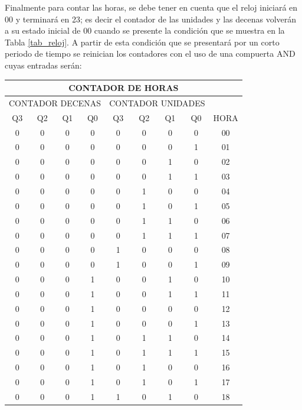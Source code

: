 \documentclass[journal]{IEEEtran}
\begin{document}
Finalmente para contar las horas, se debe tener en cuenta que el reloj iniciará en 00 y terminará en 23; es decir el contador de las unidades y las decenas volverán a su estado inicial de 00 cuando se presente la condición que se muestra en la Tabla \ref{tab_reloj}. A partir de esta condición que se presentará por un corto periodo de tiempo se reinician los contadores con el uso de una compuerta AND cuyas entradas serán:
\begin{table}[htb]
    \begin{tabular}{|c|c|c|c|c|c|c|c|c|}
    \hline
    \multicolumn{9}{|c|}{CONTADOR DE HORAS} \\ \hline
    \multicolumn{4}{|c|}{CONTADOR DECENAS} & \multicolumn{4}{c|}{CONTADOR UNIDADES} &  \\ \cline{1-8}
    Q3 & Q2 & Q1 & Q0 & Q3 & Q2 & Q1 & Q0 & \multirow{-2}{*}{HORA} \\ \hline
    0 & 0 & 0 & 0 & 0 & 0 & 0 & 0 & 00 \\ \hline
    0 & 0 & 0 & 0 & 0 & 0 & 0 & 1 & 01 \\ \hline
    0 & 0 & 0 & 0 & 0 & 0 & 1 & 0 & 02 \\ \hline
    0 & 0 & 0 & 0 & 0 & 0 & 1 & 1 & 03 \\ \hline
    0 & 0 & 0 & 0 & 0 & 1 & 0 & 0 & 04 \\ \hline
    0 & 0 & 0 & 0 & 0 & 1 & 0 & 1 & 05 \\ \hline
    0 & 0 & 0 & 0 & 0 & 1 & 1 & 0 & 06 \\ \hline
    0 & 0 & 0 & 0 & 0 & 1 & 1 & 1 & 07 \\ \hline
    0 & 0 & 0 & 0 & 1 & 0 & 0 & 0 & 08 \\ \hline
    0 & 0 & 0 & 0 & 1 & 0 & 0 & 1 & 09 \\ \hline
    0 & 0 & 0 & 1 & 0 & 0 & 1 & 0 & 10 \\ \hline
    0 & 0 & 0 & 1 & 0 & 0 & 1 & 1 & 11 \\ \hline
    0 & 0 & 0 & 1 & 0 & 0 & 0 & 0 & 12 \\ \hline
    0 & 0 & 0 & 1 & 0 & 0 & 0 & 1 & 13 \\ \hline
    0 & 0 & 0 & 1 & 0 & 1 & 1 & 0 & 14 \\ \hline
    0 & 0 & 0 & 1 & 0 & 1 & 1 & 1 & 15 \\ \hline
    0 & 0 & 0 & 1 & 0 & 1 & 0 & 0 & 16 \\ \hline
    0 & 0 & 0 & 1 & 0 & 1 & 0 & 1 & 17 \\ \hline
    0 & 0 & 0 & 1 & 1 & 0 & 1 & 0 & 18 \\ \hline

\end{tabular}
\end{table}
\end{document}
